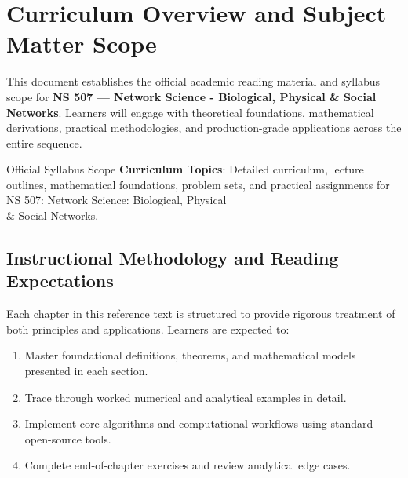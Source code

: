 \section{Curriculum Overview and Subject Matter Scope}

This document establishes the official academic reading material and syllabus scope for \textbf{NS 507 --- Network Science - Biological, Physical \& Social Networks}. Learners will engage with theoretical foundations, mathematical derivations, practical methodologies, and production-grade applications across the entire sequence.

\begin{InsightBox}{Official Syllabus Scope}
  \textbf{Curriculum Topics}: Detailed curriculum, lecture outlines, mathematical foundations, problem sets, and practical assignments for NS 507: Network Science: Biological, Physical \\& Social Networks.
\end{InsightBox}

\subsection{Instructional Methodology and Reading Expectations}

Each chapter in this reference text is structured to provide rigorous treatment of both principles and applications. Learners are expected to:
\begin{enumerate}
  \item Master foundational definitions, theorems, and mathematical models presented in each section.
  \item Trace through worked numerical and analytical examples in detail.
  \item Implement core algorithms and computational workflows using standard open-source tools.
  \item Complete end-of-chapter exercises and review analytical edge cases.
\end{enumerate}

